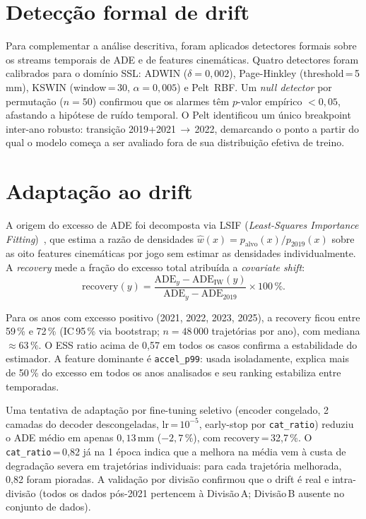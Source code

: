 \documentclass[runningheads]{llncs}
\begin{document}
\section{Detec\c{c}\~ao formal de drift}

Para complementar a an\'alise descritiva, foram aplicados detectores
formais sobre os streams temporais de ADE e de features cinem\'aticas.
Quatro detectores foram calibrados para o dom\'inio SSL: ADWIN
($\delta=0{,}002$), Page-Hinkley (threshold\,=\,5\,mm), KSWIN
(window\,=\,30, $\alpha=0{,}005$) e Pelt~RBF. Um \emph{null detector}
por permuta\c{c}\~ao ($n=50$) confirmou que os alarmes t\^em $p$-valor
emp\'irico $< 0{,}05$, afastando a hip\'otese de ru\'ido temporal.
O Pelt identificou um \'unico breakpoint inter-ano robusto: transi\c{c}\~ao
2019+2021\,$\to$\,2022, demarcando o ponto a partir do qual o modelo
come\c{c}a a ser avaliado fora de sua distribui\c{c}\~ao efetiva de treino.

\section{Adapta\c{c}\~ao ao drift}

A origem do excesso de ADE foi decomposta via LSIF (\emph{Least-Squares
Importance Fitting})~\cite{kliep}, que estima a raz\~ao de densidades
$\hat{w}(x) = p_{\text{alvo}}(x)/p_{2019}(x)$ sobre as oito features
cinem\'aticas por jogo sem estimar as densidades individualmente.
A \emph{recovery} mede a fra\c{c}\~ao do excesso total atribu\'ida a
\emph{covariate shift}:
\begin{equation}\label{eq:recovery}
\mathrm{recovery}(y) =
    \frac{\mathrm{ADE}_y - \mathrm{ADE}_{\mathrm{IW}}(y)}
         {\mathrm{ADE}_y - \mathrm{ADE}_{2019}} \times 100\,\%.
\end{equation}

Para os anos com excesso positivo (2021, 2022, 2023, 2025), a recovery
ficou entre 59\,\% e 72\,\% (IC\,95\,\% via bootstrap; $n=48\,000$
trajet\'orias por ano), com mediana $\approx 63\,\%$. O ESS ratio acima de
0{,}57 em todos os casos confirma a estabilidade do estimador. A feature
dominante \'e \texttt{accel\_p99}: usada isoladamente, explica mais de
50\,\% do excesso em todos os anos analisados e seu ranking estabiliza
entre temporadas.

Uma tentativa de adapta\c{c}\~ao por fine-tuning seletivo (encoder
congelado, 2 camadas do decoder descongeladas, lr\,=\,$10^{-5}$, early-stop
por \texttt{cat\_ratio}) reduziu o ADE m\'edio em apenas $0{,}13$\,mm
($-2{,}7\,\%$), com recovery\,=\,32{,}7\,\%. O \texttt{cat\_ratio}\,=\,0{,}82
j\'a na 1\textordfeminine{} \'epoca indica que a melhora na m\'edia vem \`a custa
de degrada\c{c}\~ao severa em trajet\'orias individuais: para cada trajet\'oria
melhorada, 0{,}82 foram pioradas. A valida\c{c}\~ao por divis\~ao confirmou
que o drift \'e real e intra-divis\~ao (todos os dados p\'os-2021 pertencem
\`a Divis\~ao\,A; Divis\~ao\,B ausente no conjunto de dados).
\end{document}
